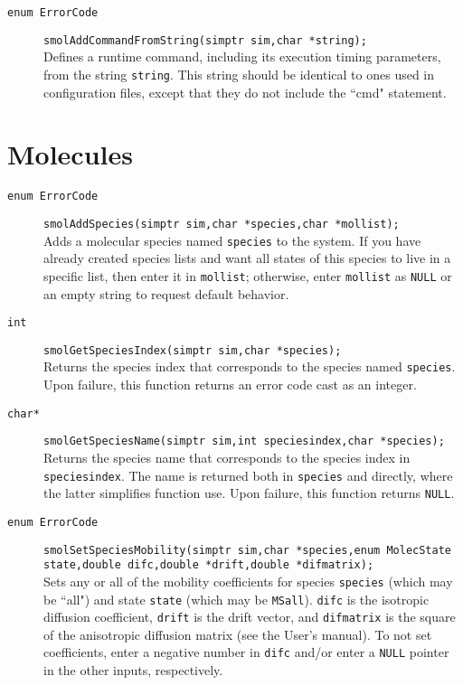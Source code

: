 \documentclass {book}
\begin{document}
\begin{description}
\item[\texttt{enum ErrorCode}]
\texttt{smolAddCommandFromString(simptr sim,char *string);}
\hfill \\
Defines a runtime command, including its execution timing parameters, from the string \texttt{string}.  This string should be identical to ones used in configuration files, except that they do not include the ``cmd" statement.

\end{description}


\section{Molecules}

\begin{description}

\item[\texttt{enum ErrorCode}]
\texttt{smolAddSpecies(simptr sim,char *species,char *mollist);}
\hfill \\
Adds a molecular species named \texttt{species} to the system.  If you have already created species lists and want all states of this species to live in a specific list, then enter it in \texttt{mollist}; otherwise, enter \texttt{mollist} as \texttt{NULL} or an empty string to request default behavior.

\item[\texttt{int}]
\texttt{smolGetSpeciesIndex(simptr sim,char *species);}
\hfill \\
Returns the species index that corresponds to the species named \texttt{species}.  Upon failure, this function returns an error code cast as an integer.

\item[\texttt{char*}]
\texttt{smolGetSpeciesName(simptr sim,int speciesindex,char *species);}
\hfill \\
Returns the species name that corresponds to the species index in \texttt{speciesindex}.  The name is returned both in \texttt{species} and directly, where the latter simplifies function use.  Upon failure, this function returns \texttt{NULL}.

\item[\texttt{enum ErrorCode}]
\texttt{smolSetSpeciesMobility(simptr sim,char *species,enum MolecState state,double difc,double *drift,double *difmatrix);}
\hfill \\
Sets any or all of the mobility coefficients for species \texttt{species} (which may be ``all") and state \texttt{state} (which may be \texttt{MSall}).  \texttt{difc} is the isotropic diffusion coefficient, \texttt{drift} is the drift vector, and \texttt{difmatrix} is the square of the anisotropic diffusion matrix (see the User's manual).  To not set coefficients, enter a negative number in \texttt{difc} and/or enter a \texttt{NULL} pointer in the other inputs, respectively.


\end{description}
\end{document}
